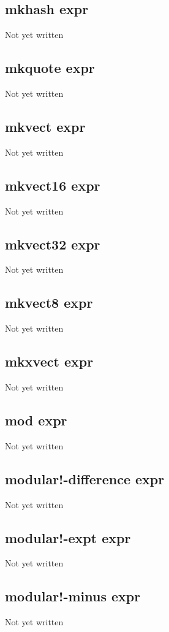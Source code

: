 \documentclass[a4paper,11pt]{article}
\begin{document}
{\subsection{\ttfamily mkhash expr}
   Not yet written

\subsection{\ttfamily mkquote expr}
   Not yet written

\subsection{\ttfamily mkvect expr}
   Not yet written

\subsection{\ttfamily mkvect16 expr}
   Not yet written

\subsection{\ttfamily mkvect32 expr}
   Not yet written

\subsection{\ttfamily mkvect8 expr}
   Not yet written

\subsection{\ttfamily mkxvect expr}
   Not yet written

\subsection{\ttfamily mod expr}
   Not yet written

\subsection{\ttfamily modular!-difference expr}
   Not yet written

\subsection{\ttfamily modular!-expt expr}
   Not yet written

\subsection{\ttfamily modular!-minus expr}
   Not yet written

}
\end{document}
